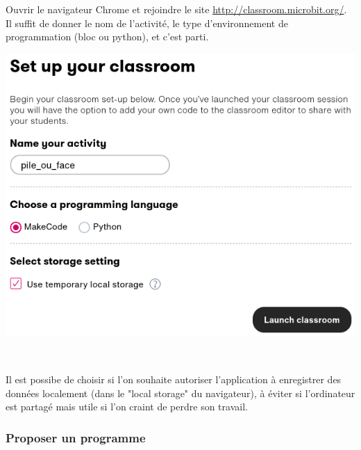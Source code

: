 \begin{methode}
    Ouvrir le navigateur Chrome et rejoindre le site \url{http://classroom.microbit.org/}.
    Il suffit de donner le nom de l'activité, le type d'environnement de programmation (bloc ou python),
     et c'est parti.
     \vspace{5mm}

    
    \centerline{\includegraphics[width=0.7\linewidth]{res/classroom_setup2.png}}~\\
\end{methode}

\begin{remarque}
    Il est possibe de choisir si l'on souhaite autoriser l'application à enregistrer des données
     localement (dans le "local storage" du navigateur), à éviter si l'ordinateur est partagé 
     mais utile si l'on craint de perdre son travail.
\end{remarque}
\vspace{5mm}

\subsubsection{Proposer un programme}


